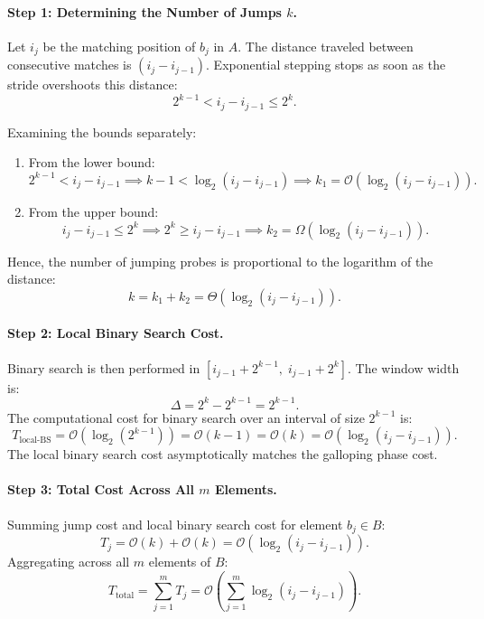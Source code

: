 \paragraph{Step 1: Determining the Number of Jumps $k$.}
Let $i_j$ be the matching position of $b_j$ in $A$. The distance traveled between consecutive matches is $(i_j - i_{j-1})$.
Exponential stepping stops as soon as the stride overshoots this distance:
\begin{equation}
  2^{k-1} < i_j - i_{j-1} \le 2^k.
  \label{eq:doubling-bracket-en}
\end{equation}

Examining the bounds separately:
\begin{enumerate}
  \item From the lower bound:
  \begin{equation}
    2^{k-1} < i_j - i_{j-1} \implies k - 1 < \log_2(i_j - i_{j-1}) \implies k_1 = \mathcal{O}(\log_2(i_j - i_{j-1})).
  \end{equation}
  \item From the upper bound:
  \begin{equation}
    i_j - i_{j-1} \le 2^k \implies 2^k \ge i_j - i_{j-1} \implies k_2 = \Omega(\log_2(i_j - i_{j-1})).
  \end{equation}
\end{enumerate}
Hence, the number of jumping probes is proportional to the logarithm of the distance:
\begin{equation}
  k = k_1 + k_2 = \Theta(\log_2(i_j - i_{j-1})).
\end{equation}

\paragraph{Step 2: Local Binary Search Cost.}
Binary search is then performed in $[i_{j-1} + 2^{k-1}, \; i_{j-1} + 2^k]$. The window width is:
\begin{equation}
  \Delta = 2^k - 2^{k-1} = 2^{k-1}.
\end{equation}
The computational cost for binary search over an interval of size $2^{k-1}$ is:
\begin{equation}
  T_{\text{local-BS}} = \mathcal{O}(\log_2(2^{k-1})) = \mathcal{O}(k - 1) = \mathcal{O}(k) = \mathcal{O}(\log_2(i_j - i_{j-1})).
\end{equation}
The local binary search cost asymptotically matches the galloping phase cost.

\paragraph{Step 3: Total Cost Across All $m$ Elements.}
Summing jump cost and local binary search cost for element $b_j \in B$:
\begin{equation}
  T_j = \mathcal{O}(k) + \mathcal{O}(k) = \mathcal{O}(\log_2(i_j - i_{j-1})).
\end{equation}
Aggregating across all $m$ elements of $B$:
\begin{equation}
  T_{\text{total}} = \sum_{j=1}^m T_j = \mathcal{O}\left(\sum_{j=1}^m \log_2(i_j - i_{j-1})\right).
  \label{eq:sum-log-distances-en}
\end{equation}

